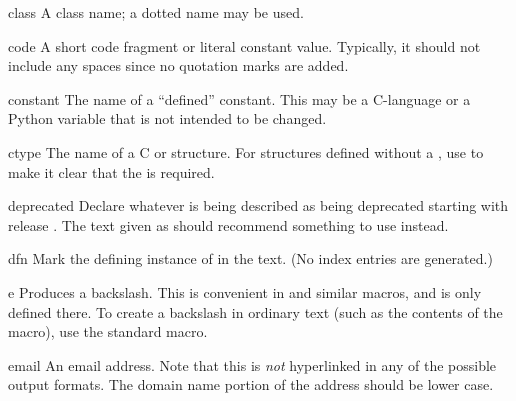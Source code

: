 \documentclass{howto}
\begin{document}
    \begin{macrodesc}{class}{}
      A class name; a dotted name may be used.
    \end{macrodesc}

    \begin{macrodesc}{code}{}
      A short code fragment or literal constant value.  Typically, it
      should not include any spaces since no quotation marks are
      added.
    \end{macrodesc}

    \begin{macrodesc}{constant}{}
      The name of a ``defined'' constant.  This may be a C-language
       or a Python variable that is not intended to be
      changed.
    \end{macrodesc}

    \begin{macrodesc}{ctype}{}
      The name of a C  or structure.  For structures
      defined without a , use  to make it clear that the  is
      required.
    \end{macrodesc}

    \begin{macrodesc}{deprecated}{}
      Declare whatever is being described as being deprecated starting 
      with release .  The text given as 
      should recommend something to use instead.
    \end{macrodesc}

    \begin{macrodesc}{dfn}{}
      Mark the defining instance of  in the text.  (No index 
      entries are generated.)
    \end{macrodesc}

    \begin{macrodesc}{e}{}
      Produces a backslash.  This is convenient in  and
      similar macros, and is only defined there.  To create a
      backslash in ordinary text (such as the contents of the
       macro), use the standard  macro.
    \end{macrodesc}

    \begin{macrodesc}{email}{}
      An email address.  Note that this is \emph{not} hyperlinked in
      any of the possible output formats.  The domain name portion of
      the address should be lower case.
    \end{macrodesc}
\end{document}
